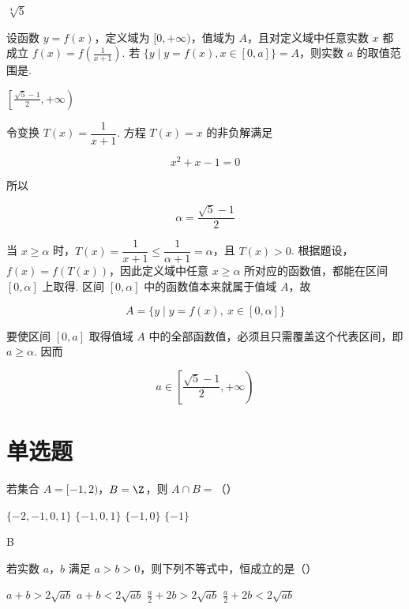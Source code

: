 \begin{answer}
\(\sqrt[4]{5}\)
\end{answer}

\begin{problem}
设函数 \(y=f(x)\)，定义域为 \([0,+\infty)\)，值域为 \(A\)，且对定义域中任意实数 \(x\) 都成立 \(f(x)=f\left(\frac1{x+1}\right)\). 若 \(\{y\mid y=f(x),x\in[0,a]\}=A\)，则实数 \(a\) 的取值范围是\fillinblank{}.
\end{problem}

\begin{answer}
\(\left[\frac{\sqrt5-1}{2},+\infty\right)\)
\end{answer}

\begin{solution}
令变换 \(T(x)=\dfrac1{x+1}\). 方程 \(T(x)=x\) 的非负解满足

\[
x^2+x-1=0
\]

所以

\[
\alpha=\frac{\sqrt5-1}{2}
\]

当 \(x\geq\alpha\) 时，\(T(x)=\dfrac1{x+1}\leq\dfrac1{\alpha+1}=\alpha\)，且 \(T(x)>0\). 根据题设，\(f(x)=f(T(x))\)，因此定义域中任意 \(x\geq\alpha\) 所对应的函数值，都能在区间 \([0,\alpha]\) 上取得. 区间 \([0,\alpha]\) 中的函数值本来就属于值域 \(A\)，故

\[
A=\{y\mid y=f(x),\ x\in[0,\alpha]\}
\]

要使区间 \([0,a]\) 取得值域 \(A\) 中的全部函数值，必须且只需覆盖这个代表区间，即 \(a\geq\alpha\). 因而

\[
a\in\left[\frac{\sqrt5-1}{2},+\infty\right)
\]
\end{solution}

\section{单选题}

\begin{problem}
若集合 \(A=[-1,2)\)，\(B=\Z\)，则 \(A\cap B=\)（\quad）

\choices
    {\(\{-2,-1,0,1\}\)}
    {\(\{-1,0,1\}\)}
    {\(\{-1,0\}\)}
    {\(\{-1\}\)}
\end{problem}

\begin{answer}
B
\end{answer}

\begin{problem}
若实数 \(a\)，\(b\) 满足 \(a>b>0\)，则下列不等式中，恒成立的是（\quad）

\choices
    {\(a+b>2\sqrt{ab}\)}
    {\(a+b<2\sqrt{ab}\)}
    {\(\frac a2+2b>2\sqrt{ab}\)}
    {\(\frac a2+2b<2\sqrt{ab}\)}
\end{problem}

